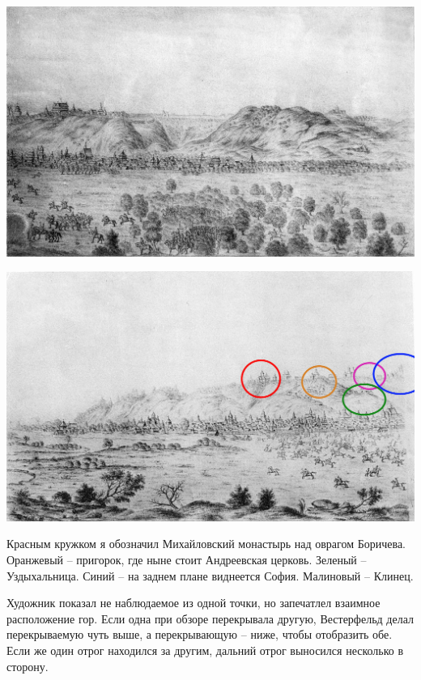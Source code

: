 \begin{center}
\includegraphics[width=\linewidth]{chast-colebanie-osnov/gora-zamkovaya-valovaya/tabl03-2.jpg}
\end{center}
\vspace*{\fill}
\newpage

\begin{center}
\includegraphics[width=\linewidth]{chast-colebanie-osnov/gora-zamkovaya-valovaya/tabl03-1-marked.jpg}
\end{center}

Красным кружком я обозначил Михайловский монастырь над оврагом Боричева. Оранжевый – пригорок, где ныне стоит Андреевская церковь. Зеленый – Уздыхальница. Синий – на заднем плане виднеется София. Малиновый – Клинец.

Художник показал не наблюдаемое из одной точки, но запечатлел взаимное расположение гор. Если одна при обзоре перекрывала другую, Вестерфельд делал перекрываемую чуть выше, а перекрывающую – ниже, чтобы отобразить обе. Если же один отрог находился за другим, дальний отрог выносился несколько в сторону.

